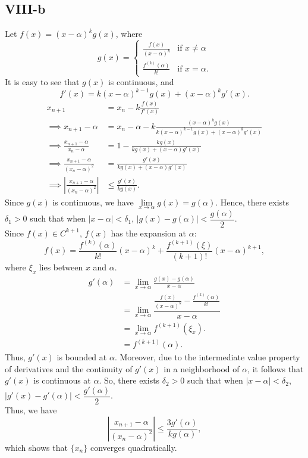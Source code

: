 \documentclass[a4paper]{article}
\begin{document}
\subsection*{VIII-b}
Let $f(x) = (x - \alpha)^k g(x)$, where
\[
g(x)=
\begin{cases}
  \frac{f(x)}{(x-\alpha)^k} &\text{if } x \neq \alpha\\
  \frac{f^{(k)}(\alpha)}{k!} &\text{if } x = \alpha.
\end{cases}
\]
It is easy to see that $g(x)$ is continuous, and
\[
f'(x) = k(x-\alpha)^{k-1}g(x) + (x-\alpha)^kg'(x).
\]
\begin{align*}
  x_{n+1} &= x_n - k\frac{f(x)}{f'(x)}\\
  \implies x_{n+1} - \alpha &= x_n - \alpha - k\frac{(x - \alpha)^k g(x)}{k(x-\alpha)^{k-1}g(x) + (x-\alpha)^kg'(x)}\\
  \implies \frac{x_{n+1} - \alpha}{x_n - \alpha} &= 1 - \frac{kg(x)}{kg(x)+ (x - \alpha)g'(x)}\\
  \implies \frac{x_{n+1} - \alpha}{(x_n - \alpha)^2} &= \frac{g'(x)}{kg(x) + (x - \alpha)g'(x)}\\
  \implies \left|\frac{x_{n+1} - \alpha}{(x_n - \alpha)^2}\right| &\leq \frac{g'(x)}{kg(x)}.
\end{align*}
Since $g(x)$ is continuous, we have $\lim\limits_{x \to \alpha} g(x) = g(\alpha)$. Hence, there exists $\delta_1 > 0$ such that when $|x - \alpha| < \delta_1$, $|g(x) - g(\alpha)| < \dfrac{g(\alpha)}{2}$.\\
Since $f(x) \in C^{k+1}$, $f(x)$ has the expansion at $\alpha$:
\[
f(x) = \frac{f^{(k)}(\alpha)}{k!}(x - \alpha)^k + \frac{f^{(k+1)}(\xi)}{(k+1)!}(x - \alpha)^{k+1},
\]
where $\xi_x$ lies between $x$ and $\alpha$.
\begin{align*}
    g'(\alpha) &= \lim\limits_{x \to \alpha} \frac{g(x) - g(\alpha)}{x - \alpha}\\
    &= \lim\limits_{x \to \alpha} \dfrac{\frac{f(x)}{(x - \alpha)^k} - \frac{f^{(k)}(\alpha)}{k!}}{x - \alpha}\\
    &= \lim\limits_{x \to \alpha} f^{(k+1)}(\xi_x).\\
    &= f^{(k+1)}(\alpha).
\end{align*}
Thus, \( g'(x) \) is bounded at \( \alpha \). Moreover, due to the intermediate value property of derivatives and the continuity of \( g'(x) \) in a neighborhood of \( \alpha \), it follows that \( g'(x) \) is continuous at \( \alpha \). So, there exists $\delta_2 > 0$ such that when $|x - \alpha| < \delta_2$, $|g'(x) - g'(\alpha)| < \dfrac{g'(\alpha)}{2}$.\\
Thus, we have
\[
\left|\frac{x_{n+1} - \alpha}{(x_n - \alpha)^2}\right| \leq \frac{3g'(\alpha)}{kg(\alpha)},
\]
which shows that $\{x_n\}$ converges quadratically.

\end{document}

